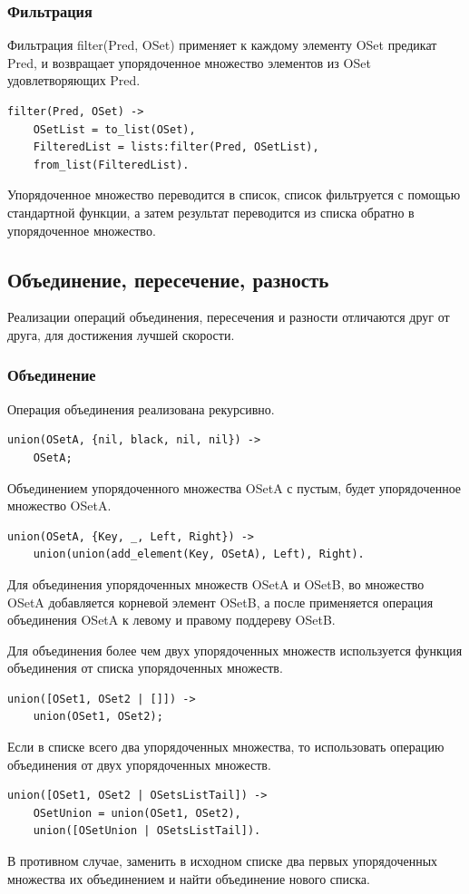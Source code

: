 		\subsubsection{Фильтрация}
			Фильтрация filter(Pred, OSet) применяет к каждому элементу OSet предикат Pred, и 
			возвращает упорядоченное множество элементов из OSet удовлетворяющих Pred.
			\begin{lstlisting}
filter(Pred, OSet) ->
    OSetList = to_list(OSet),
    FilteredList = lists:filter(Pred, OSetList),
    from_list(FilteredList).	
			\end{lstlisting}
			Упорядоченное множество переводится в список, список фильтруется с помощью стандартной 
			функции, а затем результат переводится из списка обратно в упорядоченное множество.
			
			
	\subsection{Объединение, пересечение, разность}
		Реализации операций объединения, пересечения и разности отличаются друг от друга, для 
		достижения лучшей скорости.
		
		\subsubsection{Объединение}
			Операция объединения реализована рекурсивно. 
			\begin{lstlisting}			
union(OSetA, {nil, black, nil, nil}) ->
    OSetA;
			\end{lstlisting}
			Объединением упорядоченного множества OSetA с пустым, будет упорядоченное множество OSetA.
			\begin{lstlisting}
union(OSetA, {Key, _, Left, Right}) ->
    union(union(add_element(Key, OSetA), Left), Right).
			\end{lstlisting}
			Для объединения упорядоченных множеств OSetA и OSetB, во множество OSetA добавляется корневой 
			элемент OSetB, а после применяется операция объединения OSetA к левому и правому поддереву OSetB.  
		
			Для объединения более чем двух упорядоченных множеств используется функция объединения от списка
			упорядоченных множеств.
			\begin{lstlisting}
union([OSet1, OSet2 | []]) ->
    union(OSet1, OSet2);
			\end{lstlisting}
			Если в списке всего два упорядоченных множества, то использовать операцию объединения от двух 
			упорядоченных множеств.
			\begin{lstlisting}
union([OSet1, OSet2 | OSetsListTail]) ->
    OSetUnion = union(OSet1, OSet2),
    union([OSetUnion | OSetsListTail]).
			\end{lstlisting}
			В противном случае, заменить в исходном списке два первых упорядоченных множества
			их объединением и найти объединение нового списка.
				
